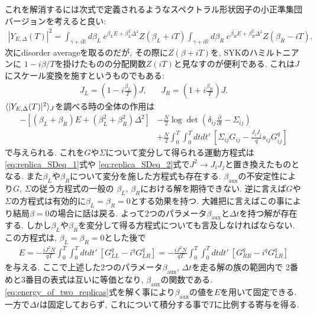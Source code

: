 これを解消するには次式で定義されるようなスペクトラル形状因子の小正準集団バージョンを考えると良い:
\begin{align}
	|Y_{E, \Delta}(T)|^2
	= \int_{\gamma + i\mathbb{R}}d\beta_L\ e^{\beta_LE + \beta_L^2\Delta^2}Z(\beta_L + iT)
	\int_{\gamma + i\mathbb{R}}d\beta_R\ e^{\beta_RE + \beta_R^2\Delta^2}Z(\beta_R - iT).
\end{align}
次にdisorder averageを取るのだが, その際に$Z(\beta + iT)$を, SYKのハミルトニアンに
$1 - i\beta / T$を掛けたものの分配関数$Z(iT)$と見なすのが便利である. 
これは$J$にスケール変換を施すというものでもある:
\begin{align}
	J_L = \left(1 - i\frac{\beta_L}{T}\right)J,\hspace{20pt}
	J_R = \left(1 + i\frac{\beta_R}{T}\right)J.
\end{align}
$\langle |Y_{E,\Delta}(T)|^2 \rangle_J$を調べる時の全体の作用は
\begin{align}
	-\left[(\beta_L + \beta_R)E + (\beta_L^2 + \beta_R^2)\Delta^2\right]
	&-\frac{N}{2}\log\det\left(\delta_{ij}\frac{\partial}{\partial t}
	- \Sigma_{ij}\right)\nonumber\\
	&+\frac{N}{2}\int_0^T\int_0^T dtdt'\ 
		\left[\Sigma_{ij}G_{ij} - \frac{J_iJ_j}{q}s_{ij}G_{ij}^q\right]
\end{align}
で与えられる. 
これを$G$や$\Sigma$について変分して得られる運動方程式は\eqref{eq:replica_SDeq_1}式や
\eqref{eq:replica_SDeq_2}式で$J^2\to J_iJ_j$と置き換えたものとなる. 
また$\beta_L$や$\beta_R$について変分を施した方程式も存在する. 
$\beta_{\mathrm{aux}}$の不安定性により$G$, $\Sigma$の従う方程式の一般の
$\beta_L$, $\beta_R$における解を期待できない. 
逆に言えば$G$や$\Sigma$の方程式は有効的に$\beta_L = \beta_R = 0$とする効果を持つ. 
大雑把に言えばこの事により結局$\beta = 0$の場合に話は戻る. 
よって2つのパラメータ$\beta_{\mathrm{aux}}$と$\Delta t$を持つ解が存在する. 
しかし$\beta_L$や$\beta_R$を変分して得る方程式についても言及しなければならない. 
この方程式は, $\beta_L = \beta_R = 0$とした後で
\begin{align}
	E
	= -\frac{iJ^2N}{qT}\int_0^T\int_0^T dtdt'\ [G_{LL}^q - i^qG_{LR}^q]
	= -\frac{iJ^2N}{qT}\int_0^T\int_0^T dtdt'\ [G_{RR}^q - i^qG_{LR}^q]
	\label{eq:energy_of_two_replicas}
\end{align}
を与える. ここで上述した2つのパラメータ$\beta_{\mathrm{aux}}$, $\Delta t$を走る解の族の範囲内で
2番めと3番目の表式は互いに等価となり, $\beta_{\mathrm{aux}}$の関数である. 
\eqref{eq:energy_of_two_replicas}式を解く事により$\beta_{\mathrm{aux}}$の値を$E$を用いて固定できる. 
一方で$\Delta t$は固定しておらず, これについて積分する事で$T$に比例する寄与を得る. 

\pagebreak